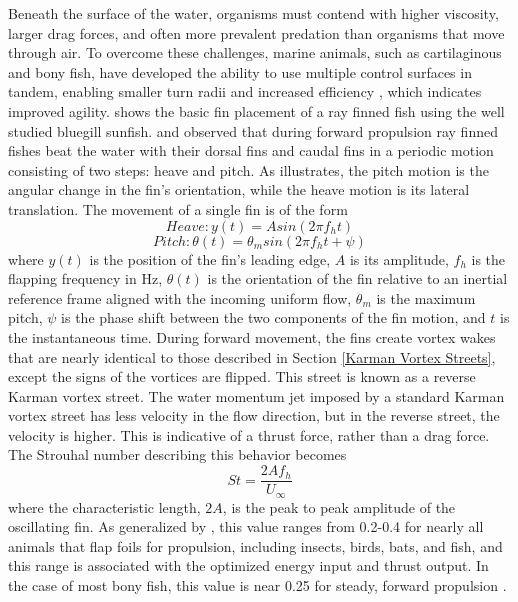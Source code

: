 	 Beneath the surface of the water, organisms must contend with higher viscosity, larger drag forces, and often more prevalent predation than organisms that move through air. To overcome these challenges, marine animals, such as cartilaginous and bony fish, have developed the ability to use multiple control surfaces in tandem, enabling smaller turn radii and increased efficiency \citep{Bandyopadhyay2002,Lauder2004,Triant2020,Drucker2001}, which indicates improved agility.  shows the basic fin placement of a ray finned fish using the well studied bluegill sunfish. \citep{Drucker2001} and \citep{Akhtar2007} observed that during forward propulsion ray finned fishes beat the water with their dorsal fins and caudal fins in a periodic motion consisting of two steps: heave and pitch. As  illustrates, the pitch motion is the angular change in the fin’s orientation, while the heave motion is its lateral translation. The movement of a single fin is of the form 
\begin{equation} \label{Eq:Single foil heave}
Heave:  y(t)=Asin(2\pi f_h t)
\end{equation}
\begin{equation} \label{Eq:Single foil pitch}
Pitch: \theta (t)=\theta _msin(2\pi f_h t+\psi)
\end{equation}
    where \(y(t)\) is the position of the fin's leading edge, \(A\) is its amplitude, \(f_h\) is the flapping frequency in Hz, \(\theta(t)\) is the orientation of the fin relative to an inertial reference frame aligned with the incoming uniform flow, \(\theta _m\) is the maximum pitch, \(\psi\) is the phase shift between the two components of the fin motion, and \(t\) is the instantaneous time. During forward movement, the fins create vortex wakes that are nearly identical to those described in Section \ref{Karman Vortex Streets}, except the signs of the vortices are flipped. This street is known as a reverse Karman vortex street. The water momentum jet imposed by a standard Karman vortex street has less velocity in the flow direction, but in the reverse street, the velocity is higher. This is indicative of a thrust force, rather than a drag force. The Strouhal number describing this behavior becomes
    \begin{equation}\label{Eq:Fin St}
        St=\frac{2Af_h}{U_\infty}
    \end{equation}
    where the characteristic length, \(2A\), is the peak to peak amplitude of the oscillating fin. As generalized by \citep{Triant1993}, this  value ranges from 0.2-0.4 for nearly all animals that flap foils for propulsion, including insects, birds, bats, and fish, and this range is associated with the optimized energy input and thrust output. In the case of most bony fish, this value is near 0.25 for steady, forward propulsion \citep{Drucker2001, Nudds2014}.
    

